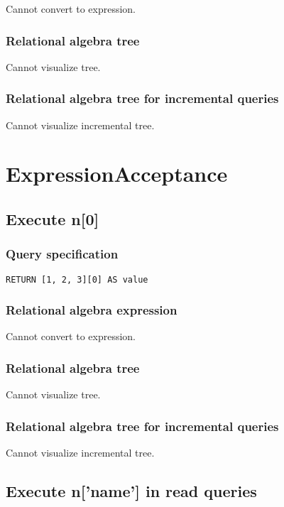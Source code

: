 Cannot convert to expression.

\subsubsection*{Relational algebra tree}

Cannot visualize tree.

\subsubsection*{Relational algebra tree for incremental queries}

Cannot visualize incremental tree.

\section{ExpressionAcceptance}

\subsection{Execute n[0]}

\subsubsection*{Query specification}

\begin{lstlisting}
RETURN [1, 2, 3][0] AS value
\end{lstlisting}

\subsubsection*{Relational algebra expression}

Cannot convert to expression.

\subsubsection*{Relational algebra tree}

Cannot visualize tree.

\subsubsection*{Relational algebra tree for incremental queries}

Cannot visualize incremental tree.

\subsection{Execute n['name'] in read queries}


